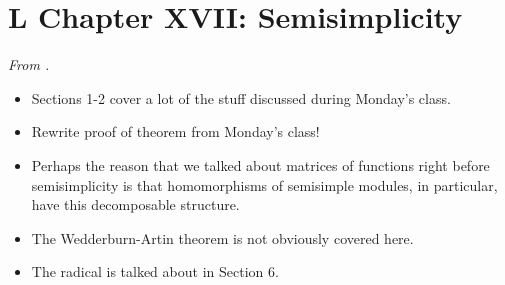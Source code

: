 \documentclass[../notes.tex]{subfiles}
\begin{document}
\section{L Chapter XVII: Semisimplicity}
\emph{From \textcite{bib:Lang}.}
\begin{itemize}
    \item {}Sections 1-2 cover a lot of the stuff discussed during Monday's class.
    \item Rewrite proof of theorem from Monday's class!
    \item {}Perhaps the reason that we talked about matrices of functions right before semisimplicity is that homomorphisms of semisimple modules, in particular, have this decomposable structure.
    \item The Wedderburn-Artin theorem is not obviously covered here.
    \item The radical is talked about in Section 6.
\end{itemize}
\end{document}
